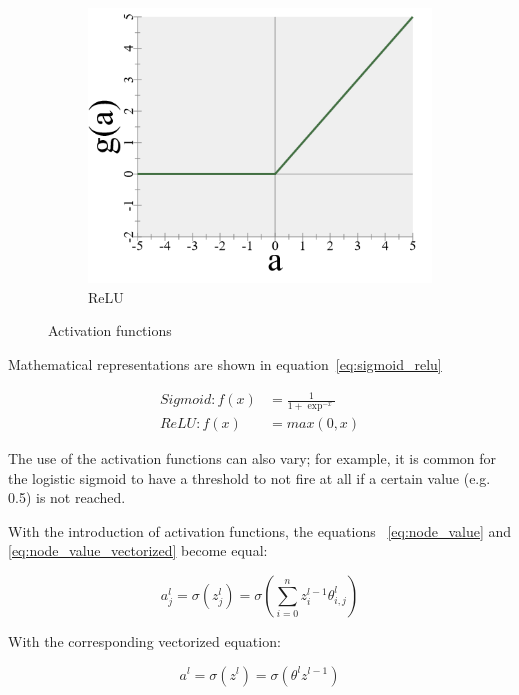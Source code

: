 \begin{figure}
\begin{subfigure}[b]{0.3\textwidth}
        \includegraphics[width=\textwidth]{images/4_relu.png}
        \caption{ReLU}
        \label{fig:activation_relu}
    \end{subfigure}
    \caption{Activation functions}
    \label{fig:activation}
\end{figure}

Mathematical representations are shown in equation~\eqref{eq:sigmoid_relu}

\begin{equation}
    \begin{split}
        Sigmoid: f(x) & = \frac{1}{1 + \exp^{-x}} \\ ReLU: f(x) & = max(0, x)
    \end{split}
    \label{eq:sigmoid_relu}
\end{equation}

The use of the activation functions can also vary; for example, it is common for the logistic sigmoid to have a threshold to not fire at all if a certain value (e.g. 0.5) is not reached.

With the introduction of activation functions, the equations ~\eqref{eq:node_value} and \eqref{eq:node_value_vectorized} become equal:

\begin{equation}
    a^l_j = \sigma(z^l_j) = \sigma(\sum^n_{i=0}z^{l-1}_i\theta^l_{i, j})
    \label{eq:activation}
\end{equation}

With the corresponding vectorized equation:

\begin{equation}
    a^l = \sigma(z^l) = \sigma(\theta^l z^{l-1})
    \label{eq:activation_vectorized}
\end{equation}

